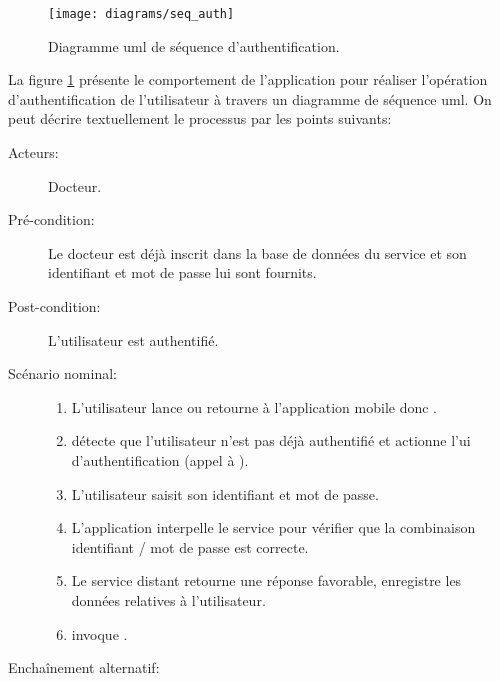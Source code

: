 \begin{figure}
\center
\texttt{[image: diagrams/seq\_auth]}
\caption{Diagramme \gls{uml} de séquence d'authentification.}
\label{fig:seq_auth}
\end{figure}

La figure \ref{fig:seq_auth} présente le comportement de l'application pour réaliser l'opération d'authentification de l'utilisateur à travers un diagramme de séquence \gls{uml}. On peut décrire textuellement le processus par les points suivants:

\begin{description}

\item[Acteurs:] Docteur.

\item[Pré-condition:] Le docteur est déjà inscrit dans la base de données du service et son identifiant et mot de passe lui sont fournits.

\item[Post-condition:] L'utilisateur est authentifié.

\item[Scénario nominal:]

\begin{enumerate}

\item L'utilisateur lance ou retourne à l'application mobile donc .

\item {} détecte que l'utilisateur n'est pas déjà authentifié et actionne l'\gls{ui} d'authentification (appel à ).

\item L'utilisateur saisit son identifiant et mot de passe.

\item L'application interpelle le service pour vérifier que la combinaison identifiant / mot de passe est correcte.

\item Le service distant retourne une réponse favorable,  enregistre les données relatives à l'utilisateur.

\item {} invoque .

\end{enumerate}

\item [Enchaînement alternatif:]


\end{description}
